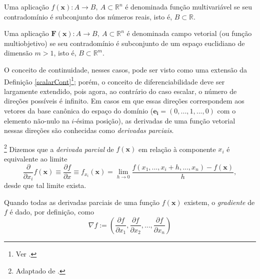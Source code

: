 \begin{definition}
Uma aplica\c{c}\~{a}o $f(\mathbf{x}): A \to B,~ A \subset \mathbb{R}^{n}$ \'{e} denominada fun\c{c}\~{a}o multivari\'{a}vel se seu contradom\'{i}nio \'{e} subconjunto dos n\'{u}meros reais, isto \'{e}, $B \subset \mathbb{R}$.
\end{definition}

\begin{definition}
Uma aplica\c{c}\~{a}o $\mathbf{F}(\mathbf{x}): A \to B,~ A \subset \mathbb{R}^{n}$ \'{e} denominada campo vetorial (ou fun\c{c}\~{a}o multiobjetivo) se seu contradom\'{i}nio \'{e} subconjunto de um espa\c{c}o euclidiano de dimens\~{a}o $m > 1$, isto \'{e}, $B \subset \mathbb{R}^{m}$.
\end{definition}

O conceito de continuidade, nesses casos, pode ser visto como uma extens\~{a}o da Defini\c{c}\~{a}o \ref{scalarCont}\footnote{Ver \cite[p. 301]{thomas2}.}; por\'{e}m, o conceito de diferenciabilidade deve ser largamente extendido, pois agora, ao contr\'{a}rio do caso escalar, o n\'{u}mero de dire\c{c}\~{o}es poss\'{i}veis \'{e} infinito. Em casos em que essas dire\c{c}\~{o}es correspondem aos vetores da base can\^{o}nica do espa\c{c}o do dom\'{i}nio ($\mathbf{e_i} = (0,...,1,...,0)$ com o elemento n\~{a}o-nulo na $i$-\'{e}sima posi\c{c}\~{a}o), as derivadas de uma fun\c{c}\~{a}o vetorial nessas dire\c{c}\~{o}es s\~{a}o conhecidas como \textit{derivadas parciais}.

\begin{definition}\footnote{Adaptado de \cite[p. 308]{thomas2}.}
Dizemos que a \textit{derivada parcial} de $f(\mathbf{x})$ em rela\c{c}\~{a}o \`{a} componente $x_i$ \'{e} equivalente ao limite
\begin{equation}
\frac{\partial}{\partial x_i}f(\mathbf{x}) \equiv \frac{\partial f}{\partial x} \equiv f_{x_i}(\mathbf{x}) = \lim_{h \to 0} \frac{f(x_1,...,x_i + h,...,x_n)-f(\mathbf{x})}{h},
\end{equation}
desde que tal limite exista.
\end{definition}

Quando todas as derivadas parciais de uma fun\c{c}\~{a}o $f(\mathbf{x})$ existem, o \textit{gradiente} de $f$ \'{e} dado, por defini\c{c}\~{a}o, como
\begin{equation}
\nabla f := (\frac{\partial f}{\partial x_1},\frac{\partial f}{\partial x_2},...,\frac{\partial f}{\partial x_n})
\end{equation}

